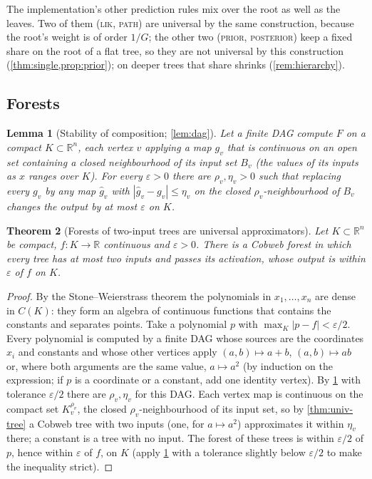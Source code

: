 \documentclass[11pt]{article}
\newtheorem{theorem}{Theorem}
\newtheorem{lemma}[theorem]{Lemma}
\theoremstyle{definition}
\theoremstyle{remark}
\newcommand{\R}{\mathbb{R}}
\begin{document}
The implementation's other prediction rules mix over the root as well as the leaves.
Two of them (\textsc{lik}, \textsc{path}) are universal by the same construction, because
the root's weight is of order $1/G$; the other two (\textsc{prior}, \textsc{posterior})
keep a fixed share on the root of a flat tree, so they are not universal by this
construction (\cref{thm:single,prop:prior}); on deeper trees that share shrinks
(\cref{rem:hierarchy}).

\subsection{Forests}

\begin{lemma}[Stability of composition; \cref{lem:dag}]\label{lem:stable}
Let a finite DAG compute $F$ on a compact $K\subset\R^n$, each vertex $v$ applying a map
$g_v$ that is continuous on an open set containing a closed neighbourhood of its input set
$B_v$ (the values of its inputs as $x$ ranges over $K$).  For every $\varepsilon>0$ there are
$\rho_v,\eta_v>0$ such that replacing every $g_v$ by any map $\hat g_v$ with
$|\hat g_v-g_v|\le\eta_v$ on the closed $\rho_v$-neighbourhood of $B_v$ changes the output by
at most $\varepsilon$ on $K$.
\end{lemma}

\begin{theorem}[Forests of two-input trees are universal approximators]\label{thm:univ-forest}
Let $K\subset\R^n$ be compact, $f:K\to\R$ continuous and $\varepsilon>0$.  There is a
Cobweb forest in which every tree has at most two inputs and passes its activation, whose
output is within $\varepsilon$ of $f$ on $K$.
\end{theorem}

\begin{proof}
By the Stone--Weierstrass theorem \citep{stone1948} the polynomials in $x_1,\dots,x_n$
are dense in $C(K)$: they form an algebra of continuous functions that contains the
constants and separates points.  Take a polynomial $p$ with $\max_K|p-f|<\varepsilon/2$.
Every polynomial is computed by a finite DAG whose sources are the coordinates $x_i$ and
constants and whose other vertices apply $(a,b)\mapsto a+b$, $(a,b)\mapsto ab$ or, where
both arguments are the same value, $a\mapsto a^2$ (by induction on the expression; if $p$ is
a coordinate or a constant, add one identity vertex).  By \cref{lem:stable} with tolerance $\varepsilon/2$ there
are $\rho_v,\eta_v$ for this DAG.  Each vertex map is continuous on the compact set
$K_v^{\rho_v}$, the closed $\rho_v$-neighbourhood of its input set, so by
\cref{thm:univ-tree} a Cobweb tree with two inputs (one, for $a\mapsto a^2$) approximates it within $\eta_v$
there;
a constant is a tree with no input.  The forest of these trees is within $\varepsilon/2$ of
$p$, hence within $\varepsilon$ of $f$, on $K$ (apply \cref{lem:stable} with a tolerance
slightly below $\varepsilon/2$ to make the inequality strict).
\end{proof}
\end{document}
